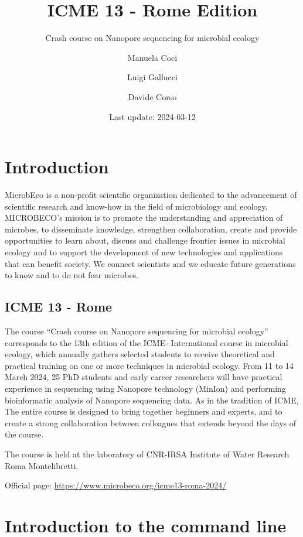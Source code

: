 \documentclass[
]{book}
\title{ICME 13 - Rome Edition}
\subtitle{Crash course on Nanopore sequencing for microbial ecology}
\author{Manuela Coci \and Luigi Gallucci \and Davide Corso}
\date{Last update: 2024-03-12}
\begin{document}
\maketitle

{
\setcounter{tocdepth}{1}
\tableofcontents
}
\chapter{Introduction}\label{introduction}

MicrobEco is a non-profit scientific organization dedicated to the advancement of scientific research and know-how in the field of microbiology and ecology. MICROBECO's mission is to promote the understanding and appreciation of microbes, to disseminate knowledge, strengthen collaboration, create and provide opportunities to learn about, discuss and challenge frontier issues in microbial ecology and to support the development of new technologies and applications that can benefit society. We connect scientists and we educate future generations to know and to do not fear microbes.

\section{ICME 13 - Rome}\label{icme-13---rome}

The course ``Crash course on Nanopore sequencing for microbial ecology'' corresponds to the 13th edition of the ICME- International course in microbial ecology, which annually gathers selected students to receive theoretical and practical training on one or more techniques in microbial ecology. From 11 to 14 March 2024, 25 PhD students and early career researchers will have practical experience in sequencing using Nanopore technology (MinIon) and performing bioinformatic analysis of Nanopore sequencing data. As in the tradition of ICME, The entire course is designed to bring together beginners and experts, and to create a strong collaboration between colleagues that extends beyond the days of the course.

The course is held at the laboratory of CNR-IRSA Institute of Water Research Roma Montelibretti.

Official page: \url{https://www.microbeco.org/icme13-roma-2024/}

\chapter{Introduction to the command line}\label{introduction-to-the-command-line}
\end{document}
